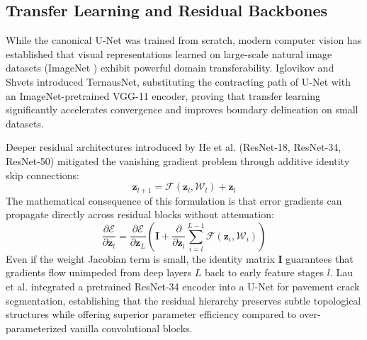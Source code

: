 \documentclass[10pt,a4paper]{article}
\begin{document}
\subsection{Transfer Learning and Residual Backbones}
While the canonical U-Net was trained from scratch, modern computer vision has established that visual representations learned on large-scale natural image datasets (ImageNet \cite{deng2009imagenet}) exhibit powerful domain transferability. Iglovikov and Shvets \cite{iglovikov2018ternausnet} introduced TernausNet, substituting the contracting path of U-Net with an ImageNet-pretrained VGG-11 encoder, proving that transfer learning significantly accelerates convergence and improves boundary delineation on small datasets.

Deeper residual architectures introduced by He et al. \cite{he2016deep} (ResNet-18, ResNet-34, ResNet-50) mitigated the vanishing gradient problem through additive identity skip connections:
\begin{equation}
    \mathbf{z}_{l+1} = \mathcal{F}(\mathbf{z}_l, \mathcal{W}_l) + \mathbf{z}_l
    \label{eq:residual_connection}
\end{equation}
The mathematical consequence of this formulation is that error gradients can propagate directly across residual blocks without attenuation:
\begin{equation}
    \frac{\partial \mathcal{E}}{\partial \mathbf{z}_l} = \frac{\partial \mathcal{E}}{\partial \mathbf{z}_L} \left( \mathbf{I} + \frac{\partial}{\partial \mathbf{z}_l} \sum_{i=l}^{L-1} \mathcal{F}(\mathbf{z}_i, \mathcal{W}_i) \right)
    \label{eq:residual_gradient}
\end{equation}
Even if the weight Jacobian term is small, the identity matrix $\mathbf{I}$ guarantees that gradients flow unimpeded from deep layers $L$ back to early feature stages $l$. Lau et al. \cite{lau2020pavement} integrated a pretrained ResNet-34 encoder into a U-Net for pavement crack segmentation, establishing that the residual hierarchy preserves subtle topological structures while offering superior parameter efficiency compared to over-parameterized vanilla convolutional blocks.
\end{document}
